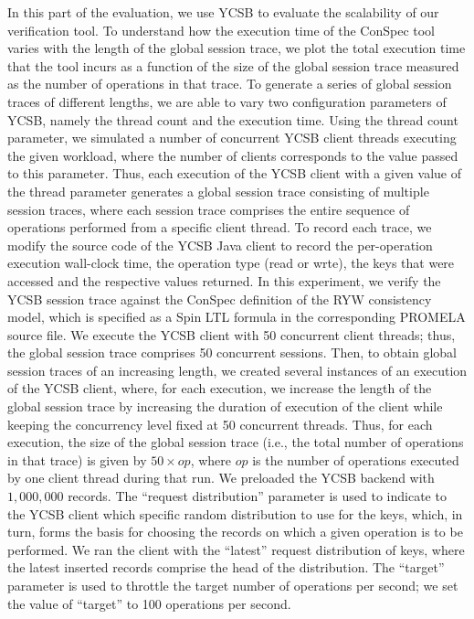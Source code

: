 \documentclass[journal,compsoc]{IEEEtran}
\begin{document}
In this part of the evaluation, we use YCSB to evaluate the scalability of our verification tool.  To understand how the execution time of the ConSpec tool varies with the length of  the global session trace, we plot the total execution time that the tool incurs as a function of the size of the global session trace measured as the number of operations in that trace. To generate a series of global session traces of  different lengths, we are able to vary two configuration parameters of YCSB, namely the thread count and the execution time.  %
 Using the thread count parameter, we simulated a number of concurrent YCSB client threads executing the given workload, where the number of clients corresponds to the value passed to this parameter. Thus, each execution of the YCSB client with a given value of the thread parameter generates a global session trace consisting of multiple session traces, where each session trace comprises the entire sequence of operations performed from a specific client thread. To record each trace, we modify the source code of the YCSB Java client to record the per-operation execution wall-clock time, the operation type (read or wrte), the keys that were accessed and the respective values returned.
 In this experiment, we verify the YCSB session  trace against the ConSpec definition of the RYW consistency model, which is specified as a Spin LTL formula in the corresponding  PROMELA source file.
 We execute the YCSB client with 50 concurrent client threads; thus, the global session  trace comprises 50 concurrent sessions.
 Then, to obtain global session traces of an increasing length, we created several instances of an execution of the YCSB client, where, for each execution, we increase the length of the global session trace by increasing the  duration of execution of the client while keeping the concurrency level fixed at 50 concurrent threads. Thus, for each execution, the size of the global session trace (i.e., the total number of  operations in that trace) is given by $50 \times op$,  where $op$ is the number of operations executed by one client thread during that run.
   We  preloaded the YCSB backend with $1,000,000$ records.  The ``request distribution'' parameter is used to indicate to the YCSB client which specific random distribution to use for the keys, which, in turn, forms the basis for choosing the records on which a given operation is to be performed. We ran the client with the ``latest'' request distribution of keys, where the latest inserted records comprise the head of the distribution. The  ``target'' parameter is used to throttle  the target number of operations per second; we set the value of ``target'' to 100  operations per second. 
\end{document}
